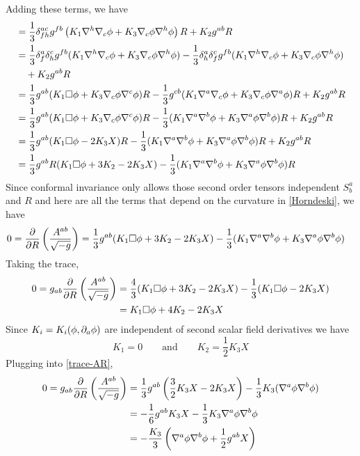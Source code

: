 Adding these terms, we have
\begin{align*}
  [\eqref{K1}+\eqref{K2}+\eqref{K3}]&=\frac{1}{3}\d^{ac}_{fh}g^{fb}\left(K_1\nabla^h\nabla_c\f +K_3\nabla_c\f\nabla^h\f \right)R+K_2g^{ab}R\\
  &=\frac{1}{3}\d^{a}_f\d^{c}_{h}g^{fb}(K_1\nabla^h\nabla_c\f +K_3\nabla_c\f\nabla^h\f ) -\frac{1}{3}\d^{a}_h\d^{c}_{f}g^{fb}(K_1\nabla^h\nabla_c\f +K_3\nabla_c\f\nabla^h\f )\\
  &\quad +K_2g^{ab}R\\
  &=\frac{1}{3}g^{ab}(K_1\Box\f +K_3\nabla_c\f \nabla^c\f )R -\frac{1}{3}g^{cb}(K_1\nabla^{a}\nabla_c\f +K_3\nabla_c \f \nabla^{a}\f )R+K_2g^{ab}R\\
  &=\frac{1}{3}g^{ab}(K_1\Box\f +K_3\nabla_c\f\nabla^c\f )R -\frac{1}{3}(K_1\nabla^{a}\nabla^b\f +K_3\nabla^{a}\f\nabla^b\f )R +K_2g^{ab}R\\
  &=\frac{1}{3}g^{ab}(K_1\Box\f -2K_3X)R -\frac{1}{3}(K_1\nabla^{a}\nabla^b\f +K_3\nabla^{a}\f\nabla^b\f )R +K_2g^{ab}R\\
  &=\frac{1}{3}g^{ab}R(K_1\Box\f+3K_2-2K_3X)-\frac{1}{3}(K_1\nabla^{a}\nabla^b\f +K_3\nabla^{a}\f\nabla^b\f )R
\end{align*}
Since conformal invariance only allows those second order tensors independent $S^{a}_b$ and $R$ and here are all the terms that depend on the curvature in \eqref{Horndeski}, we have
\begin{align}
  0=\pdv{R}\left(\frac{A^{ab}}{\sqrt{-g}}\right)&=\frac{1}{3}g^{ab}(K_1\Box\phi+3K_2-2K_3X)-\frac{1}{3}(K_1\nabla^{a}\nabla^b\phi +K_3\nabla^{a}\phi\nabla^b\phi )
\end{align}
Taking the trace,
\begin{equation}\label{trace-AR}
\begin{split}
 0= g_{ab}\pdv{R}\left(\frac{A^{ab}}{\sqrt{-g}}\right)&=\frac{4}{3}(K_1\Box\phi+3K_2-2K_3X)-\frac{1}{3}(K_1\Box\phi -2K_3X)\\
  &=K_1\Box\phi +4K_2-2K_3X
\end{split}
\end{equation}
Since $K_i=K_i(\phi,\partial_a\phi )$ are independent of second scalar field derivatives we have
\begin{equation}
  K_1=0\qquad \text{and}\qquad K_2=\frac{1}{2}K_3X
\end{equation}
Plugging into \eqref{trace-AR},
\begin{align}
   0= g_{ab}\pdv{R}\left(\frac{A^{ab}}{\sqrt{-g}}\right)&=\frac{1}{3}g^{ab}\left(\frac{3}{2}K_3X-2K_3X\right)-\frac{1}{3}K_3(\nabla^{a}\phi\nabla^b\phi )\\
   &=-\frac{1}{6}g^{ab}K_3X-\frac{1}{3}K_3\nabla^{a}\phi\nabla^b\phi \\
   &=-\frac{K_3}{3}\left(\nabla^{a}\phi\nabla^b\phi +\frac{1}{2}g^{ab}X\right) \label{0-AR}
\end{align}
